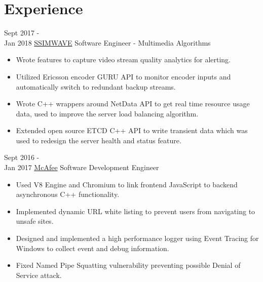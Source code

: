 \documentclass[letterpaper]{twentysecondcv} %
\begin{document}
\makeprofile %



\section{Experience}

\begin{twenty} %
		\twentyitem
    	{Sept 2017 -\\Jan 2018}
        {\href{https://www.ssimwave.com}{SSIMWAVE}}
        {Software Engineer - Multimedia Algorithms}
        {}
        {
        {\begin{itemize}
        \item Wrote features to capture video stream quality analytics for alerting.
        \item Utilized Ericsson encoder GURU API to monitor encoder inputs and automatically switch to redundant backup streams.
        \item Wrote C++ wrappers around NetData API to get real time resource usage data, used to improve the server load balancing algorithm.
        \item Extended open source ETCD C++ API to write transient data which was used to redesign the server health and status feature.
    \end{itemize}}
        }

	\twentyitem
    	{Sept 2016 - \\Jan 2017}
        {\href{https://www.mcafee.com/ca/index.html}{McAfee}}
        {Software Development Engineer}
        {}
        {
        {\begin{itemize}
        \item Used V8 Engine and Chromium to link frontend JavaScript to backend asynchronous C++ functionality.
        \item Implemented dynamic URL white listing to prevent users from navigating to unsafe sites.
        \item Designed and implemented a high performance logger using Event Tracing for Windows to collect event and debug information.
        \item Fixed Named Pipe Squatting vulnerability preventing possible Denial of Service attack.
    \end{itemize}}
        }
        

\end{twenty}
\end{document}

